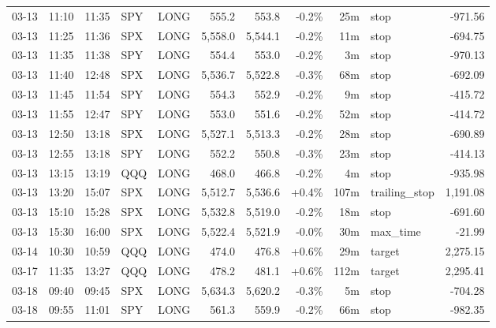 \documentclass[11pt,a4paper,twoside]{article}
\begin{document}
\begin{center}
\begin{longtable}{>{\color{txtmain}}l l l l l r r r r >{\color{txtmain}}l r}
03-13 & 11:10 & 11:35 & SPY & LONG & 555.2 & 553.8 & \textcolor{lossred}{-0.2\%} & 25m & stop & \textcolor{lossred}{-971.56} \\
03-13 & 11:25 & 11:36 & SPX & LONG & 5,558.0 & 5,544.1 & \textcolor{lossred}{-0.2\%} & 11m & stop & \textcolor{lossred}{-694.75} \\
03-13 & 11:35 & 11:38 & SPY & LONG & 554.4 & 553.0 & \textcolor{lossred}{-0.2\%} & 3m & stop & \textcolor{lossred}{-970.13} \\
03-13 & 11:40 & 12:48 & SPX & LONG & 5,536.7 & 5,522.8 & \textcolor{lossred}{-0.3\%} & 68m & stop & \textcolor{lossred}{-692.09} \\
03-13 & 11:45 & 11:54 & SPY & LONG & 554.3 & 552.9 & \textcolor{lossred}{-0.2\%} & 9m & stop & \textcolor{lossred}{-415.72} \\
03-13 & 11:55 & 12:47 & SPY & LONG & 553.0 & 551.6 & \textcolor{lossred}{-0.2\%} & 52m & stop & \textcolor{lossred}{-414.72} \\
03-13 & 12:50 & 13:18 & SPX & LONG & 5,527.1 & 5,513.3 & \textcolor{lossred}{-0.2\%} & 28m & stop & \textcolor{lossred}{-690.89} \\
03-13 & 12:55 & 13:18 & SPY & LONG & 552.2 & 550.8 & \textcolor{lossred}{-0.3\%} & 23m & stop & \textcolor{lossred}{-414.13} \\
03-13 & 13:15 & 13:19 & QQQ & LONG & 468.0 & 466.8 & \textcolor{lossred}{-0.2\%} & 4m & stop & \textcolor{lossred}{-935.98} \\
03-13 & 13:20 & 15:07 & SPX & LONG & 5,512.7 & 5,536.6 & \textcolor{wingreen}{+0.4\%} & 107m & trailing\_stop & \textcolor{wingreen}{1,191.08} \\
03-13 & 15:10 & 15:28 & SPX & LONG & 5,532.8 & 5,519.0 & \textcolor{lossred}{-0.2\%} & 18m & stop & \textcolor{lossred}{-691.60} \\
03-13 & 15:30 & 16:00 & SPX & LONG & 5,522.4 & 5,521.9 & \textcolor{lossred}{-0.0\%} & 30m & max\_time & \textcolor{lossred}{-21.99} \\
03-14 & 10:30 & 10:59 & QQQ & LONG & 474.0 & 476.8 & \textcolor{wingreen}{+0.6\%} & 29m & target & \textcolor{wingreen}{2,275.15} \\
03-17 & 11:35 & 13:27 & QQQ & LONG & 478.2 & 481.1 & \textcolor{wingreen}{+0.6\%} & 112m & target & \textcolor{wingreen}{2,295.41} \\
03-18 & 09:40 & 09:45 & SPX & LONG & 5,634.3 & 5,620.2 & \textcolor{lossred}{-0.3\%} & 5m & stop & \textcolor{lossred}{-704.28} \\
03-18 & 09:55 & 11:01 & SPY & LONG & 561.3 & 559.9 & \textcolor{lossred}{-0.2\%} & 66m & stop & \textcolor{lossred}{-982.35} \\

\end{longtable}
\end{center}
\end{document}
